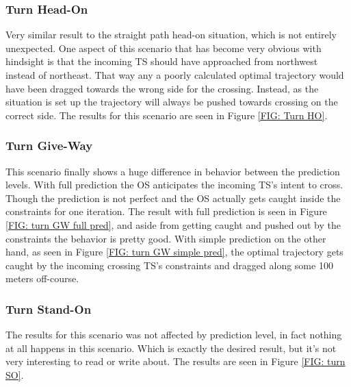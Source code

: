 \clearpage
\subsubsection{Turn Head-On}
Very similar result to the straight path head-on situation, which is not entirely unexpected. One aspect of this scenario that
has become very obvious with hindsight is that the incoming TS should have approached from northwest instead of northeast. That way
any a poorly calculated optimal trajectory would have been dragged towards the wrong side for the crossing. Instead, as the situation is set
up the trajectory will always be pushed towards crossing on the correct side.
The results for this scenario are seen in Figure \ref{FIG: Turn HO}.

\subsubsection{Turn Give-Way}
This scenario finally shows a huge difference in behavior between the prediction levels. With full prediction the OS
anticipates the incoming TS's intent to cross. Though the prediction is not perfect and the OS actually gets caught inside the
constraints for one iteration. The result with full prediction is seen in Figure \ref{FIG: turn GW full pred}, and aside from
getting caught and pushed out by the constraints the behavior is pretty good.
With simple prediction on the other hand, as seen in Figure \ref{FIG: turn GW simple pred}, the optimal trajectory gets caught by the
incoming crossing TS's constraints and dragged along some 100 meters off-course.

\subsubsection{Turn Stand-On}
The results for this scenario was not affected by prediction level, in fact nothing at all happens in this scenario. Which is exactly the desired result,
but it's not very interesting to read or write about. The results are seen in Figure \ref{FIG: turn SO}.

